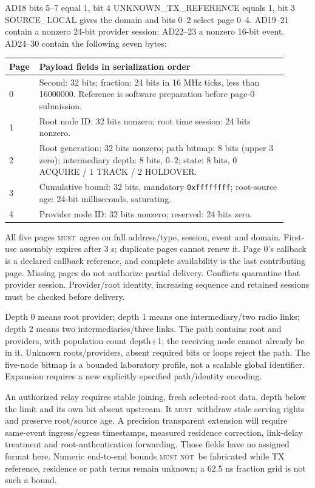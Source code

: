 \documentclass[11pt,letterpaper]{article}
\newcommand{\must}{\textsc{must}}
\newcommand{\mustnot}{\textsc{must not}}
\newcommand{\hex}[1]{\texttt{#1}}
\begin{document}
AD18 bits 5--7 equal 1, bit 4 UNKNOWN\_TX\_REFERENCE equals 1, bit 3 SOURCE\_LOCAL gives the domain and bits 0--2 select page 0--4. AD19--21 contain a nonzero 24-bit provider session; AD22--23 a nonzero 16-bit event. AD24--30 contain the following seven bytes:
\begin{center}\small
\begin{tabular}{@{}L{0.07\linewidth}L{0.84\linewidth}@{}}\toprule
Page & Payload fields in serialization order \\ & Second: 32 bits; fraction: 24 bits in 16 MHz ticks, less than 16000000. Reference is software preparation before page-0 submission. \\
1 & Root node ID: 32 bits nonzero; root time session: 24 bits nonzero. \\
2 & Root generation: 32 bits nonzero; path bitmap: 8 bits (upper 3 zero); intermediary depth: 8 bits, 0--2; state: 8 bits, 0 ACQUIRE / 1 TRACK / 2 HOLDOVER. \\
3 & Cumulative bound: 32 bits, mandatory \hex{0xffffffff}; root-source age: 24-bit milliseconds, saturating. \\
4 & Provider node ID: 32 bits nonzero; reserved: 24 bits zero. \\\bottomrule
\end{tabular}
\end{center}
All five pages \must\ agree on full address/type, session, event and domain. First-use assembly expires after 3 s; duplicate pages cannot renew it. Page 0's callback is a declared callback reference, and complete availability is the last contributing page. Missing pages do not authorize partial delivery. Conflicts quarantine that provider session. Provider/root identity, increasing sequence and retained sessions must be checked before delivery.

Depth 0 means root provider; depth 1 means one intermediary/two radio links; depth 2 means two intermediaries/three links. The path contains root and providers, with population count depth+1; the receiving node cannot already be in it. Unknown roots/providers, absent required bits or loops reject the path. The five-node bitmap is a bounded laboratory profile, not a scalable global identifier. Expansion requires a new explicitly specified path/identity encoding.

An authorized relay requires stable joining, fresh selected-root data, depth below the limit and its own bit absent upstream. It \must\ withdraw stale serving rights and preserve root/source age. A precision transparent extension will require same-event ingress/egress timestamps, measured residence correction, link-delay treatment and root-authentication forwarding. Those fields have no assigned format here. Numeric end-to-end bounds \mustnot\ be fabricated while TX reference, residence or path terms remain unknown; a 62.5 ns fraction grid is not such a bound.
\end{document}
